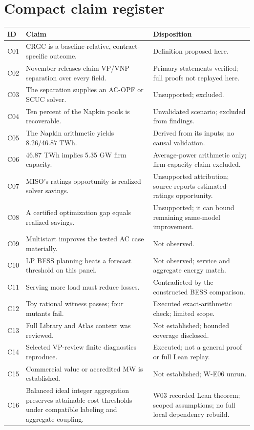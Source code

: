 \documentclass[11pt,letterpaper]{article}
\begin{document}
\section{Compact claim register}
\begingroup\small
\begin{longtable}{P{.10\linewidth}P{.46\linewidth}P{.35\linewidth}}
\toprule ID & Claim & Disposition\\\midrule\endhead
C01 & CRGC is a baseline-relative, contract-specific outcome. & Definition proposed here.\\
C02 & November releases claim VP/VNP separation over every field. & Primary statements verified; full proofs not replayed here.\\
C03 & The separation supplies an AC-OPF or SCUC solver. & Unsupported; excluded.\\
C04 & Ten percent of the Napkin pools is recoverable. & Unvalidated scenario; excluded from findings.\\
C05 & The Napkin arithmetic yields 8.26/46.87 TWh. & Derived from its inputs; no causal validation.\\
C06 & 46.87 TWh implies 5.35 GW firm capacity. & Average-power arithmetic only; firm-capacity claim excluded.\\
C07 & MISO's ratings opportunity is realized solver savings. & Unsupported attribution; source reports estimated ratings opportunity.\\
C08 & A certified optimization gap equals realized savings. & Unsupported; it can bound remaining same-model improvement.\\
C09 & Multistart improves the tested AC case materially. & Not observed.\\
C10 & LP BESS planning beats a forecast threshold on this panel. & Not observed; service and aggregate energy match.\\
C11 & Serving more load must reduce losses. & Contradicted by the constructed BESS comparison.\\
C12 & Toy rational witness passes; four mutants fail. & Executed exact-arithmetic check; limited scope.\\
C13 & Full Library and Atlas context was reviewed. & Not established; bounded coverage disclosed.\\
C14 & Selected VP-review finite diagnostics reproduce. & Executed; not a general proof or full Lean replay.\\
C15 & Commercial value or accredited MW is established. & Not established; W-E06 unrun.\\
C16 & Balanced ideal integer aggregation preserves attainable cost thresholds under compatible labeling and aggregate coupling. & W03 recorded Lean theorem; scoped assumptions; no full local dependency rebuild.\\

\end{longtable}
\end{document}
